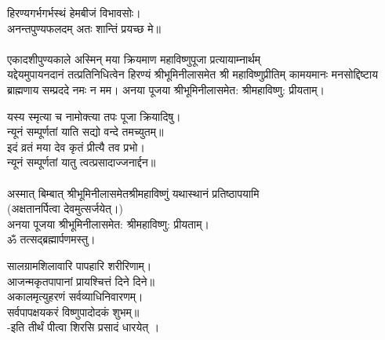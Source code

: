 हिरण्यगर्भगर्भस्थं हेमबीजं विभावसोः।\\
अनन्तपुण्यफलदम् अतः शान्तिं प्रयच्छ मे॥\\
 \\
एकादशीपुण्यकाले अस्मिन् मया क्रियमाण महाविष्णुपूजा प्रत्यायाम्नार्थम्\\
यद्देयमुपायनदानं तत्प्रतिनिधित्वेन हिरण्यं श्रीभूमिनीलासमेत श्री महाविष्णुप्रीतिम् 
कामयमानः मनसोद्दिष्टाय ब्राह्मणाय सम्प्रददे नमः न मम। 
अनया पूजया श्रीभूमिनीलासमेत: श्रीमहाविष्णु: प्रीयताम्। 
 
 यस्य स्मृत्या च नामोक्त्या तपः पूजा क्रियादिषु।\\
न्यूनं सम्पूर्णतां याति सद्यो वन्दे तमच्युतम्॥ \\
इदं व्रतं मया देव कृतं प्रीत्यै तव प्रभो।\\
न्यूनं सम्पूर्णतां यातु त्वत्प्रसादाज्जनार्द्दन॥\\
 \\
अस्मात् बिम्बात् श्रीभूमिनीलासमेतश्रीमहाविष्णुं यथास्थानं प्रतिष्ठापयामि\\
(अक्षतानर्पित्वा देवमुत्सर्जयेत्।)\\
अनया पूजया श्रीभूमिनीलासमेत: श्रीमहाविष्णु: प्रीयताम्। \\
ॐ तत्सद्ब्रह्मार्पणमस्तु।
 
सालग्रामशिलावारि पापहारि शरीरिणाम्।\\
आजन्मकृतपापानां प्रायश्चित्तं दिने दिने॥\\
अकालमृत्युहरणं सर्वव्याधिनिवारणम्।\\
सर्वपापक्षयकरं विष्णुपादोदकं शुभम्॥ \\
 -इति तीर्थं पीत्वा शिरसि प्रसादं धारयेत् ।
